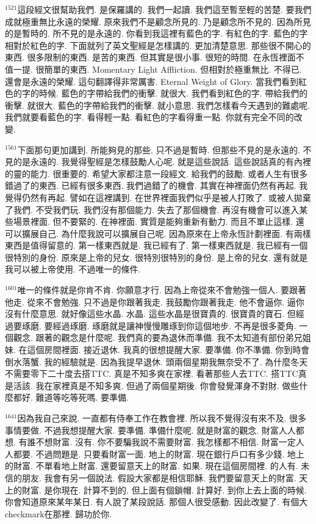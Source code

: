 \documentclass{book}
\begin{document}
$^{1521}$這段經文很幫助我們.
是保羅講的.
我們一起讀.
我們這至暫至輕的苦楚.
要我們成就極重無比永遠的榮耀.
原來我們不是顧念所見的.
乃是顧念所不見的.
因為所見的是暫時的.
所不見的是永遠的.
你看到我這裡有藍色的字.
有紅色的字.
藍色的字相對於紅色的字.
下面就列了英文聖經是怎樣講的.
更加清楚意思.
那些很不開心的東西.
很多限制的東西.
是苦的東西.
但其實是很小事.
很短的時間.
在永恆裡面不值一提.
很簡單的東西.
Momentary Light Affliction.
但相對於極重無比.
不得已.
還會是永遠的榮耀.
這句翻譯得非常厲害.
Eternal Weight of Glory.
當我們看到紅色的字的時候.
藍色的字帶給我們的衝擊.
就很大.
我們看到紅色的字.
帶給我們的衝擊.
就很大.
藍色的字帶給我們的衝擊.
就小意思.
我們怎樣看今天遇到的難處呢.
我們就要看藍色的字.
看得輕一點.
看紅色的字看得重一點.
你就有完全不同的改變.

$^{1561}$下面那句更加講到.
所能夠見的那些.
只不過是暫時.
但那些不見的是永遠的.
不見的是永遠的.
我覺得聖經是怎樣鼓勵人心呢.
就是這些說話.
這些說話真的有內裡的靈的能力.
很重要的.
希望大家都注意一段經文.
給我們的鼓勵.
或者人生有很多錯過了的東西.
已經有很多東西.
我們過錯了的機會.
其實在神裡面仍然有再起.
我覺得仍然有再起.
譬如在這裡講到.
在世界裡面我們似乎是被人打敗了.
或被人拋棄了我們.
不受我們玩.
我們沒有那個能力.
失去了那個機會.
再沒有機會可以進入某些場景裡面.
但不要緊的.
在神裡面.
實質是能夠重新有動力.
而且不單止這樣.
還可以擴展自己.
為什麼我說可以擴展自己呢.
因為原來在上帝永恆計劃裡面.
有兩樣東西是值得留意的.
第一樣東西就是.
我已經有了.
第一樣東西就是.
我已經有一個很特別的身份.
原來是上帝的兒女.
很特別很特別的身份.
是上帝的兒女.
還有就是我可以被上帝使用.
不過唯一的條件.

$^{1601}$唯一的條件就是你肯不肯.
你願意才行.
因為上帝從來不會勉強一個人.
要跟著他走.
從來不會勉強.
只不過是你跟著我走.
我鼓勵你跟著我走.
他不會逼你.
逼你沒有什麼意思.
就好像這些水晶.
水晶.
這些水晶是很寶貴的.
很寶貴的寶石.
但經過要琢磨.
要經過琢磨.
琢磨就是讓神慢慢雕琢到你這個地步.
不再是很多菱角.
一個觀念.
跟著的觀念是什麼呢.
我們真的要為退休而準備.
我不太知道有部份弟兄姐妹.
在這個房間裡面.
接近退休.
我真的很想提醒大家.
要準備.
你不準備.
你到時會倒水落蟹.
我的經驗就是.
因為我提早退休.
頭兩個星期我無奈受不了.
為什麼冬天不需要零下二十度去搭TTC.
真是不知多爽在家裡.
看著那些人去TTC.
搭TTC真是活該.
我在家裡真是不知多爽.
但過了兩個星期後.
你會發覺渾身不對財.
做些什麼都好.
難道等吃等死嗎.
要準備.

$^{1641}$因為我自己來說.
一直都有侍奉工作在教會裡.
所以我不覺得沒有來不及.
很多事情要做.
不過我想提醒大家.
要準備.
準備什麼呢.
就是財富的觀念.
財富人人都想.
有誰不想財富.
沒有.
你不要騙我說不需要財富.
我怎樣都不相信.
財富一定人人都要.
不過問題是.
只要看財富一面.
地上的財富.
現在銀行戶口有多少錢.
地上的財富.
不單看地上財富.
還要留意天上的財富.
如果.
現在這個房間裡.
的人有.
未信的朋友.
我會有另一個說法.
假設大家都是相信耶穌.
我們要留意天上的財富.
天上的財富.
是你現在.
計算不到的.
但上面有個鎖帽.
計算好.
到你上去上面的時候.
你會知道原來某年某日.
有人說了某段說話.
那個人很受感動.
因此改變了.
有個大checkmark在那裡.
歸功於你.
\end{document}
